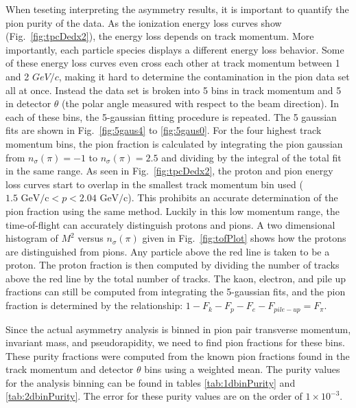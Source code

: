 \documentclass[letterpaper, abstract = on,listof=totoc, bibliography=totoc]{scrreprt}
\begin{document}
When teseting interpreting the asymmetry results, it is important to quantify the pion purity of the data. As the ionization energy loss curves show (Fig.~\ref{fig:tpcDedx2}), the energy loss depends on track momentum. More importantly, each particle species displays a different energy loss behavior. Some of these energy loss curves even cross each other at track momentum between 1 and 2 $GeV/c$, making it hard to determine the contamination in the pion data set all at once. Instead the data set is broken into 5 bins in track momentum and 5 in detector $\theta$ (the polar angle measured with respect to the beam direction). In each of these bins, the 5-gaussian fitting procedure is repeated. The 5 gaussian fits are shown in Fig.~\ref{fig:5gaus4} to \ref{fig:5gaus0}. For the four highest track momentum bins, the pion fraction is calculated by integrating the pion gaussian from $n_\sigma(\pi) = -1$ to $n_\sigma(\pi) = 2.5$ and dividing by the integral of the total fit in the same range. As seen in Fig.~\ref{fig:tpcDedx2}, the proton and pion energy loss curves start to overlap in the smallest track momentum bin used ($1.5 \text{ GeV/c} < p < 2.04 \text{ GeV/c}$). This prohibits an accurate determination of the pion fraction using the same method. Luckily in this low momentum range, the time-of-flight can accurately distinguish protons and pions. A two dimensional histogram of $M^2$ versus $n_\sigma(\pi)$ given in Fig.~\ref{fig:tofPlot} shows how the protons are distinguished from pions. Any particle above the red line is taken to be a proton. The proton fraction is then computed by dividing the number of tracks above the red line by the total number of tracks. The kaon, electron, and pile up fractions can still be computed from integrating the 5-gaussian fits, and the pion fraction is determined by the relationship: $1-F_k - F_p - F_e - F_{pile-up} = F_\pi$. 

Since the actual asymmetry analysis is binned in pion pair transverse momentum, invariant mass, and pseudorapidity, we need to find pion fractions for these bins. These purity fractions were computed from the known pion fractions found in the track momentum and detector $\theta$ bins using a weighted mean. The purity values for the analysis binning can be found in tables \ref{tab:1dbinPurity} and \ref{tab:2dbinPurity}. The error for these purity values are on the order of $1\times 10^{-3}$.
\end{document}
